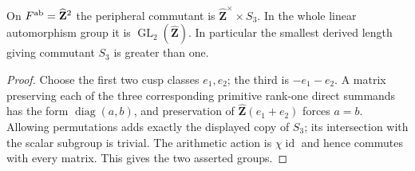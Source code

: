 \begin{proposition}
\label{A:abelian-commutant}
On $F^{\rm ab}=\widehat{\mathbf Z}^2$ the peripheral commutant is
$\widehat{\mathbf Z}^{\times}\times S_3$.  In the whole linear
automorphism group it is $\operatorname{GL}_2(\widehat{\mathbf Z})$.
In particular the smallest derived length giving commutant $S_3$
is greater than one.
\end{proposition}
\begin{proof}
Choose the first two cusp classes $e_1,e_2$; the third is
$-e_1-e_2$.  A matrix preserving each of the three corresponding
primitive rank-one direct summands has the form
$\operatorname{diag}(a,b)$, and preservation of
$\widehat{\mathbf Z}(e_1+e_2)$ forces $a=b$.
Allowing permutations adds exactly the displayed copy of $S_3$;
its intersection with the scalar subgroup is trivial.
The arithmetic action is $\chi\operatorname{id}$ and hence
commutes with every matrix.  This gives the two asserted groups.
\end{proof}

